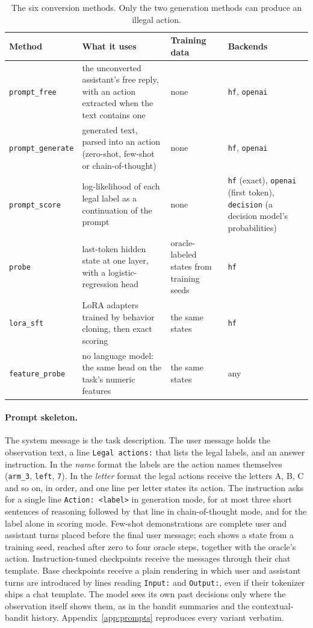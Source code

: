 \begin{table}[t]
\centering\small
\caption{The six conversion methods. Only the two generation methods can produce an illegal action.}
\label{tab:methods}
\begin{tabularx}{\linewidth}{@{}l X X X@{}}
\toprule
Method & What it uses & Training data & Backends\\
\midrule
\texttt{prompt\_free} & the unconverted assistant's free reply, with an action extracted when the text contains one & none & \texttt{hf}, \texttt{openai}\\
\texttt{prompt\_generate} & generated text, parsed into an action (zero-shot, few-shot or chain-of-thought) & none & \texttt{hf}, \texttt{openai}\\
\texttt{prompt\_score} & log-likelihood of each legal label as a continuation of the prompt & none & \texttt{hf} (exact), \texttt{openai} (first token), \texttt{decision} (a decision model's probabilities)\\
\texttt{probe} & last-token hidden state at one layer, with a logistic-regression head & oracle-labeled states from training seeds & \texttt{hf}\\
\texttt{lora\_sft} & LoRA adapters trained by behavior cloning, then exact scoring & the same states & \texttt{hf}\\
\texttt{feature\_probe} & no language model: the same head on the task's numeric features & the same states & any\\
\bottomrule
\end{tabularx}
\end{table}

\paragraph{Prompt skeleton.}
The system message is the task description. The user message holds the observation text, a line \texttt{Legal actions:} that lists the legal labels, and an answer instruction. In the \emph{name} format the labels are the action names themselves (\texttt{arm\_3}, \texttt{left}, \texttt{7}). In the \emph{letter} format the legal actions receive the letters A, B, C and so on, in order, and one line per letter states its action. The instruction asks for a single line \texttt{Action: <label>} in generation mode, for at most three short sentences of reasoning followed by that line in chain-of-thought mode, and for the label alone in scoring mode. Few-shot demonstrations are complete user and assistant turns placed before the final user message; each shows a state from a training seed, reached after zero to four oracle steps, together with the oracle's action. Instruction-tuned checkpoints receive the messages through their chat template. Base checkpoints receive a plain rendering in which user and assistant turns are introduced by lines reading \texttt{Input:} and \texttt{Output:}, even if their tokenizer ships a chat template. The model sees its own past decisions only where the observation itself shows them, as in the bandit summaries and the contextual-bandit history. Appendix~\ref{app:prompts} reproduces every variant verbatim.

